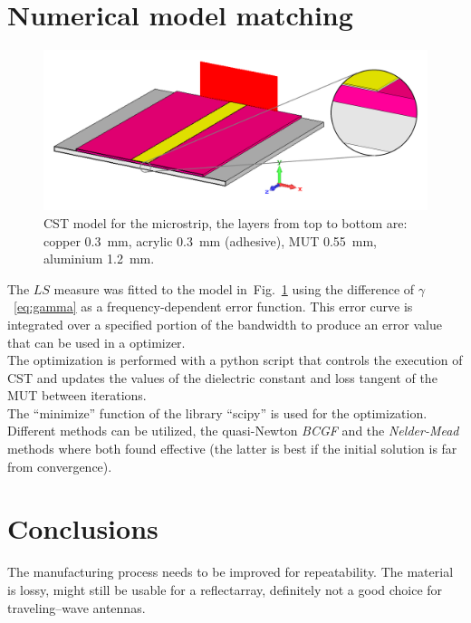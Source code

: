 \documentclass[11pt,a4paper]{article}
\newcommand{\fig}[1]{Fig.~\ref{#1}}
\newcommand{\laser}[1]{``#1''}
\begin{document}
    \section{Numerical model matching}
    \label{sec:numerical-model-matching}
    \begin{figure}[!b]
        \includegraphics[width=\textwidth]{fitter}
        \caption{CST model for the microstrip, the layers from top to bottom are: copper 0.3~mm, acrylic 0.3~mm
            (adhesive), MUT 0.55~mm, aluminium 1.2~mm.}
        \label{fig:fitter}
    \end{figure}
    The $LS$ measure was fitted to the model in~\fig{fig:fitter} using the difference of $\gamma$~\eqref{eq:gamma}
    as a frequency-dependent error function.
    This error curve is integrated over a specified portion of the bandwidth to produce an error value that can be used
    in a optimizer.\\
    The optimization is performed with a python script that controls the execution of CST and updates the values of the
    dielectric constant and loss tangent of the MUT between iterations.\\
    The \laser{minimize} function of the library \laser{scipy} is used for the optimization.
    Different methods can be utilized, the quasi-Newton \emph{BCGF} and the \emph{Nelder-Mead} methods where both found
    effective (the latter is best if the initial solution is far from convergence).




    \section{Conclusions}
    \label{sec:conclusion}
    The manufacturing process needs to be improved for repeatability.
    The material is lossy, might still be usable for a reflectarray, definitely not a good choice for traveling--wave antennas.

    \clearpage
    
    
\end{document}
